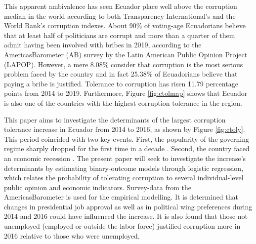 \documentclass[12pt,a4]{article}\usepackage[]{graphicx}\usepackage[]{xcolor}
\begin{document}
This apparent ambivalence has seen Ecuador place well above the corruption median in the world according to both Transparency International's and the World Bank's corruption indexes. About 90\% of voting-age Ecuadorians believe that at least half of politicians are corrupt and more than a quarter of them admit having been involved with bribes in 2019, according to the AmericasBarometer (AB) survey by the Latin American Public Opinion Project (LAPOP). However, a mere 8.08\% consider that corruption is the most serious problem faced by the country and in fact 25.38\% of Ecuadorians believe that paying a bribe is justified. Tolerance to corruption has risen 11.79 percentage points from 2014 to 2019. Furthermore, Figure \ref{fig:ctolmap} shows that Ecuador is also one of the countries with the highest corruption tolerance in the region.

This paper aims to investigate the determinants of the largest corruption tolerance increase in Ecuador from 2014 to 2016, as shown by Figure \ref{fig:ctoly}. This period coincided with two key events. First, the popularity of the governing regime sharply dropped for the first time in a decade \parencite{Quillupangui.2016}. Second, the country faced an economic recession \parencite{Weisbrot.2017}. The present paper will seek to investigate the increase's determinants by estimating binary-outcome models through logistic regression, which relates the probability of tolerating corruption to several individual-level public opinion and economic indicators. Survey-data from the AmericasBarometer is used for the empirical modelling. It is determined that changes in presidential job approval as well as in political wing preferences during 2014 and 2016 could have influenced the increase. It is also found that those not unemployed (employed or outside the labor force) justified corruption more in 2016 relative to those who were unemployed.

\end{document}
